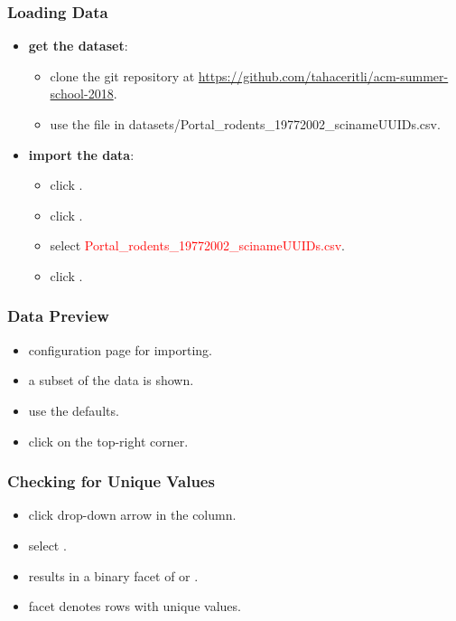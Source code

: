 \documentclass{beamer}					%
\begin{document}
\begin{frame}[c]
\frametitle{Loading Data}
\begin{itemize}
\item \textbf{get the dataset}:
\begin{itemize}
\item clone the git repository at \footnotesize{\url{https://github.com/tahaceritli/acm-summer-school-2018}}.
\item use the file in datasets/Portal\_rodents\_19772002\_scinameUUIDs.csv.
\end{itemize}
\item \textbf{import the data}:
\begin{itemize}
\item click \say{\textcolor{red}{Create Project}}.
\item click \say{\textcolor{red}{Choose Files}}.
\item select \textcolor{red}{Portal\_rodents\_19772002\_scinameUUIDs.csv}.
\item click \say{\textcolor{red}{Next}}.
\end{itemize} 
\end{itemize}
\end{frame}

\begin{frame}[c]
\frametitle{Data Preview}
\begin{itemize}
\item configuration page for importing.
\item a subset of the data is shown.
\item use the defaults.
\item click \say{\textcolor{red}{Create Project}} on the top-right corner.
\end{itemize}
\end{frame}

\begin{frame}[c]
\frametitle{Checking for Unique Values}
\begin{itemize}
\item click drop-down arrow in the  column.
\item select \say{\textcolor{red}{Facet\textgreater Customized Facet\textgreater Duplicates Facet}}.
\item results in a binary facet of  or . 
\item {} facet denotes rows with unique values.
\end{itemize}
\end{frame}
\end{document}
